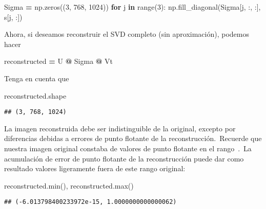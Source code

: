 \documentclass[
]{article}
\newenvironment{Shaded}{\begin{snugshade}}{\end{snugshade}}
\newcommand{\BuiltInTok}[1]{#1}
\newcommand{\ControlFlowTok}[1]{\textcolor[rgb]{0.13,0.29,0.53}{\textbf{#1}}}
\newcommand{\DecValTok}[1]{\textcolor[rgb]{0.00,0.00,0.81}{#1}}
\newcommand{\KeywordTok}[1]{\textcolor[rgb]{0.13,0.29,0.53}{\textbf{#1}}}
\newcommand{\NormalTok}[1]{#1}
\newcommand{\OperatorTok}[1]{\textcolor[rgb]{0.81,0.36,0.00}{\textbf{#1}}}
\begin{document}
\begin{Shaded}
\begin{Highlighting}[]
\NormalTok{Sigma }\OperatorTok{=}\NormalTok{ np.zeros((}\DecValTok{3}\NormalTok{, }\DecValTok{768}\NormalTok{, }\DecValTok{1024}\NormalTok{))}
\ControlFlowTok{for}\NormalTok{ j }\KeywordTok{in} \BuiltInTok{range}\NormalTok{(}\DecValTok{3}\NormalTok{):}
\NormalTok{    np.fill\_diagonal(Sigma[j, :, :], s[j, :])}
\end{Highlighting}
\end{Shaded}

Ahora, si deseamos reconstruir el SVD completo (sin aproximación),
podemos hacer

\begin{Shaded}
\begin{Highlighting}[]
\NormalTok{reconstructed }\OperatorTok{=}\NormalTok{ U }\OperatorTok{@}\NormalTok{ Sigma }\OperatorTok{@}\NormalTok{ Vt}
\end{Highlighting}
\end{Shaded}

Tenga en cuenta que

\begin{Shaded}
\begin{Highlighting}[]
\NormalTok{reconstructed.shape}
\end{Highlighting}
\end{Shaded}

\begin{verbatim}
## (3, 768, 1024)
\end{verbatim}

La imagen reconstruida debe ser indistinguible de la original, excepto
por diferencias debidas a errores de punto flotante de la
reconstrucción.~Recuerde que nuestra imagen original constaba de valores
de punto flotante en el rango~.~La acumulación de error de punto
flotante de la reconstrucción puede dar como resultado valores
ligeramente fuera de este rango original:

\begin{Shaded}
\begin{Highlighting}[]
\NormalTok{reconstructed.}\BuiltInTok{min}\NormalTok{(), reconstructed.}\BuiltInTok{max}\NormalTok{()}
\end{Highlighting}
\end{Shaded}

\begin{verbatim}
## (-6.013798400233972e-15, 1.0000000000000062)
\end{verbatim}
\end{document}

